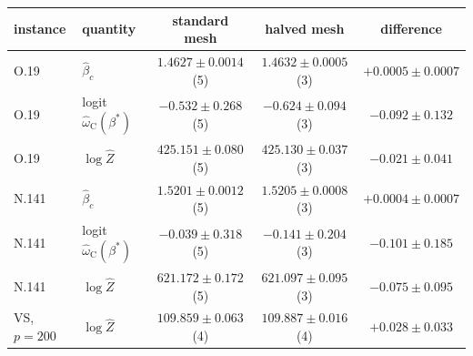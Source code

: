\begin{tabular}{llccc}
\toprule
instance & quantity & standard mesh & halved mesh & difference \\
\midrule
O.19 & $\hat\beta_c$ & $1.4627\pm0.0014$ (5) & $1.4632\pm0.0005$ (3) & $+0.0005\pm0.0007$ \\
O.19 & logit $\hat\omega_{\mathrm C}(\beta^\ast)$ & $-0.532\pm0.268$ (5) & $-0.624\pm0.094$ (3) & $-0.092\pm0.132$ \\
O.19 & $\log\hat Z$ & $425.151\pm0.080$ (5) & $425.130\pm0.037$ (3) & $-0.021\pm0.041$ \\
N.141 & $\hat\beta_c$ & $1.5201\pm0.0012$ (5) & $1.5205\pm0.0008$ (3) & $+0.0004\pm0.0007$ \\
N.141 & logit $\hat\omega_{\mathrm C}(\beta^\ast)$ & $-0.039\pm0.318$ (5) & $-0.141\pm0.204$ (3) & $-0.101\pm0.185$ \\
N.141 & $\log\hat Z$ & $621.172\pm0.172$ (5) & $621.097\pm0.095$ (3) & $-0.075\pm0.095$ \\
VS, $p{=}200$ & $\log\hat Z$ & $109.859\pm0.063$ (4) & $109.887\pm0.016$ (4) & $+0.028\pm0.033$ \\
\bottomrule
\end{tabular}
